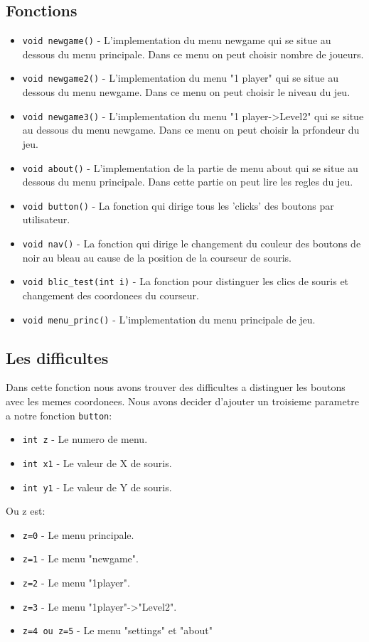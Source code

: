 \documentclass[11pt,a4paper]{article}
\begin{document}
\subsection{Fonctions}
\begin{itemize}
\item \verb|void newgame()| - L'implementation du menu newgame qui se situe au dessous du menu principale. Dans ce menu on peut choisir nombre de joueurs.
\item \verb|void newgame2()| - L'implementation du menu "1 player" qui se situe au dessous du menu newgame. Dans ce menu on peut choisir le niveau du jeu. 
\item \verb|void newgame3()| - L'implementation du menu "1 player->Level2" qui se situe au dessous du menu newgame. Dans ce menu on peut choisir la prfondeur du jeu.
\item \verb|void about()| - L'implementation de la partie de menu about qui se situe au dessous du menu principale. Dans cette partie on peut lire les regles du jeu.
\item \verb|void button()| - La fonction qui dirige tous les 'clicks'  des boutons par utilisateur. 
\item \verb|void nav()| - La fonction qui dirige le changement du couleur des boutons de noir au bleau au cause de la position de la courseur de souris.
\item \verb|void blic_test(int i)| - La fonction pour distinguer les clics de souris et changement des coordonees du courseur.
\item \verb|void menu_princ()| - L'implementation du menu principale de jeu. 
 
\end{itemize}

\subsection{Les difficultes}
Dans cette fonction nous avons trouver des difficultes a distinguer les boutons avec les memes coordonees. Nous avons decider d'ajouter un troisieme parametre a notre fonction \verb|button|:
\begin{itemize}
\item \texttt{int z} - Le numero de menu.
\item \texttt{int x1} - Le valeur de X de souris. 
\item \texttt{int y1} - Le valeur de Y de souris.
\end{itemize}

Ou z est:
 \begin{itemize}
\item \texttt{z=0} - Le menu principale.
\item \texttt{z=1} - Le menu "newgame". 
\item \texttt{z=2} - Le menu "1player".
\item \texttt{z=3} - Le menu "1player"->"Level2". 
\item \texttt{z=4 ou z=5} - Le menu "settings" et "about"
\end{itemize}
\end{document}

